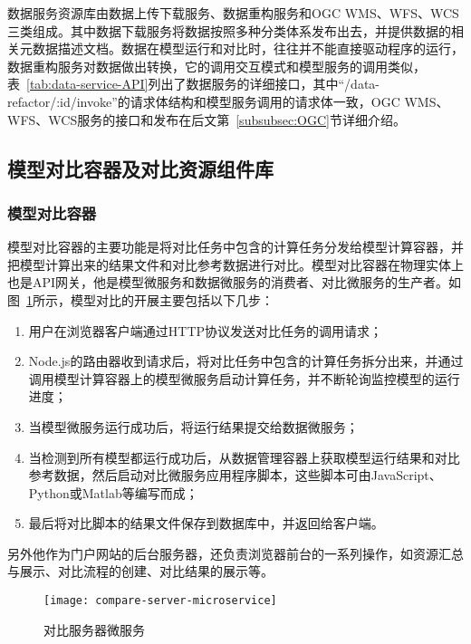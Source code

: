 数据服务资源库由数据上传下载服务、数据重构服务和OGC WMS、WFS、WCS三类组成。其中数据下载服务将数据按照多种分类体系发布出去，并提供数据的相关元数据描述文档。数据在模型运行和对比时，往往并不能直接驱动程序的运行，数据重构服务对数据做出转换，它的调用交互模式和模型服务的调用类似，表~\ref{tab:data-service-API}列出了数据服务的详细接口，其中“/data-refactor/:id/invoke”的请求体结构和模型服务调用的请求体一致，OGC WMS、WFS、WCS服务的接口和发布在后文第~\ref{subsubsec:OGC}节详细介绍。

\subsection{模型对比容器及对比资源组件库}
\subsubsection{模型对比容器}
模型对比容器的主要功能是将对比任务中包含的计算任务分发给模型计算容器，并把模型计算出来的结果文件和对比参考数据进行对比。模型对比容器在物理实体上也是API网关，他是模型微服务和数据微服务的消费者、对比微服务的生产者。如图~\ref{fig:compare-server-microservice}所示，模型对比的开展主要包括以下几步：

\begin{enumerate}[(1)]
\item 用户在浏览器客户端通过HTTP协议发送对比任务的调用请求；
\item Node.js的路由器收到请求后，将对比任务中包含的计算任务拆分出来，并通过调用模型计算容器上的模型微服务启动计算任务，并不断轮询监控模型的运行进度；
\item 当模型微服务运行成功后，将运行结果提交给数据微服务；
\item 当检测到所有模型都运行成功后，从数据管理容器上获取模型运行结果和对比参考数据，然后启动对比微服务应用程序脚本，这些脚本可由JavaScript、Python或Matlab等编写而成；
\item 最后将对比脚本的结果文件保存到数据库中，并返回给客户端。
\end{enumerate}

另外他作为门户网站的后台服务器，还负责浏览器前台的一系列操作，如资源汇总与展示、对比流程的创建、对比结果的展示等。

\begin{figure}[!htbp]
    \centering
    \texttt{[image: compare-server-microservice]}
    \caption{对比服务器微服务}
    \label{fig:compare-server-microservice}
\end{figure}

